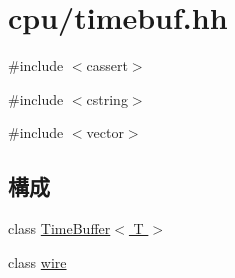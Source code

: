 \hypertarget{timebuf_8hh}{
\section{cpu/timebuf.hh}
\label{timebuf_8hh}
}
{\ttfamily \#include $<$cassert$>$}\par
{\ttfamily \#include $<$cstring$>$}\par
{\ttfamily \#include $<$vector$>$}\par
\subsection*{構成}
\begin{DoxyCompactItemize}
\item 
class \hyperlink{classTimeBuffer}{TimeBuffer$<$ T $>$}
\item 
class \hyperlink{classTimeBuffer_1_1wire}{wire}
\end{DoxyCompactItemize}
